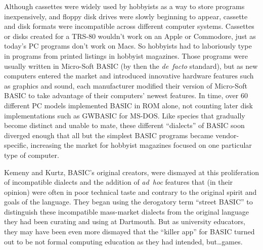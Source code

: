 Although cassettes were widely used by hobbyists as a way to store
programs inexpensively, and floppy disk drives were slowly beginning
to appear, cassette and disk formats were incompatible across
different computer systems.
Cassettes or disks created for a TRS-80 wouldn't work on an Apple or
Commodore, just as today's PC programs don't work on Macs.
So hobbyists had to laboriously type in programs from printed listings
in hobbyist magazines.
Those programs were usually written in Micro-Soft BASIC
(by then the \emph{de~facto} standard),  but as new computers entered
the market and introduced
innovative hardware features such as
graphics and sound, each manufacturer modified their version of 
Micro-Soft BASIC to take advantage of their computers' newest features.
In time, over 60 different PC models implemented BASIC in ROM alone,
not counting later disk implementations such as GWBASIC for MS-DOS.
Like species that gradually become distinct and unable to mate, these
different ``dialects'' of BASIC soon diverged enough that all but the
simplest BASIC programs became vendor-specific, increasing the market
for hobbyist magazines focused on one particular type of computer.

Kemeny and Kurtz, BASIC's original creators, were dismayed at this
proliferation of incompatible dialects and the addition of
\emph{ad~hoc} features that (in their opinion) were often in poor
technical taste and contrary to the original spirit and goals of the
language.
They began using the derogatory term ``street BASIC'' to distinguish
these incompatible mass-market dialects from the original language
they had been curating and using at Dartmouth.
But as university educators, they may have been even more dismayed
that the ``killer app'' for BASIC turned out to be not formal
computing education as they had intended, but\ldots{}games.


